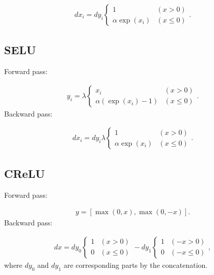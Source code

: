 \documentclass{article}
\begin{document}
\begin{eqnarray}
  dx_i= dy_i \left\{
  \begin{array}{ll}
    1 & (x > 0)\\
    \alpha \exp(x_i) & (x \leq 0)
  \end{array} \right.. 
\end{eqnarray}


\subsection{SELU}

Forward pass:

\begin{eqnarray}
  y_i= \lambda \left\{
  \begin{array}{ll}
    x_i & (x > 0)\\
    \alpha (\exp(x_i) - 1) & (x \leq 0)
  \end{array} \right..
\end{eqnarray}
%
Backward pass:

\begin{eqnarray}
  dx_i= dy_i \lambda \left\{
  \begin{array}{ll}
    1 & (x > 0)\\
    \alpha \exp(x_i) & (x \leq 0)
  \end{array} \right.. 
\end{eqnarray}


\subsection{CReLU}

Forward pass:

\begin{eqnarray}
  y = [\max(0, x), \max(0, -x)].
\end{eqnarray}
%
Backward pass:

\begin{eqnarray}
  dx = 
  dy_0 \left\{
  \begin{array}{ll}
    1 & (x > 0)\\
    0 & (x \leq 0)
  \end{array} \right. 
  - 
  dy_1 \left\{
  \begin{array}{ll}
    1 & (-x > 0)\\
    0 & (-x \leq 0)
  \end{array} \right.,
\end{eqnarray}
%
where $dy_0$ and $dy_1$ are corresponding parts by the concatenation.
\end{document}
